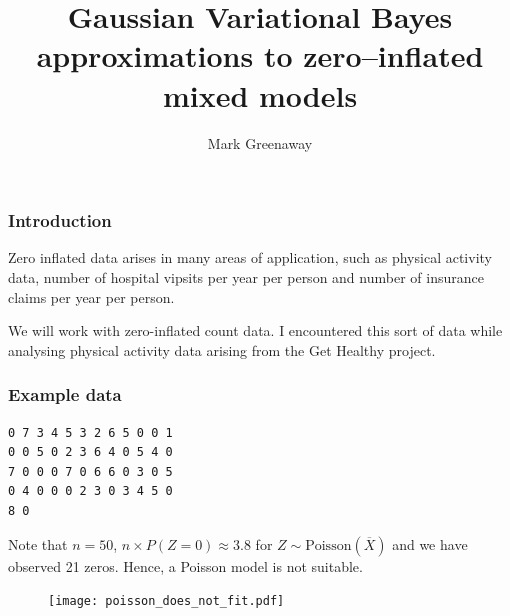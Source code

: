 \documentclass{beamer}
\title{Gaussian Variational Bayes approximations to zero--inflated mixed models}
\author{Mark Greenaway}
\begin{document}
\begin{frame}
	\titlepage
\end{frame}

\begin{frame}
	\frametitle{Introduction}
	Zero inflated data arises in many areas of application, such as physical
	activity data, number of hospital vipsits per year per person and
	number of insurance claims per year per person.
			
	\bigskip 
	We will work with zero-inflated count data. I encountered this sort of data 
	while analysing physical activity data arising from the Get Healthy project.
\end{frame}

\begin{frame}[fragile]
	\frametitle{Example data}
	\begin{verbatim}
0 7 3 4 5 3 2 6 5 0 0 1
0 0 5 0 2 3 6 4 0 5 4 0
7 0 0 0 7 0 6 6 0 3 0 5
0 4 0 0 0 2 3 0 3 4 5 0
8 0
	\end{verbatim}
			
	\noindent Note that $n=50$, 
	$n\times P(Z = 0) \approx 3.8$ for $Z\sim\mbox{Poisson}(\overline{X})$
	and we have observed 21 zeros. Hence,
	a Poisson model is not suitable.
			
	\begin{figure}
		\texttt{[image: poisson\_does\_not\_fit.pdf]}
	\end{figure}%
\end{frame}
\end{document}

